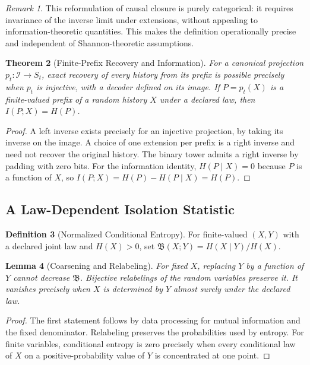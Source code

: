 \documentclass[11pt,a4paper]{article}
\theoremstyle{plain}
\newtheorem{theorem}{Theorem}[section]
\newtheorem{lemma}[theorem]{Lemma}
\theoremstyle{definition}
\newtheorem{definition}[theorem]{Definition}
\theoremstyle{remark}
\newtheorem{remark}[theorem]{Remark}
\begin{document}
\begin{remark}
This reformulation of causal closure is purely categorical: it requires invariance of the inverse limit under extensions, without appealing to information-theoretic quantities. This makes the definition operationally precise and independent of Shannon-theoretic assumptions.
\end{remark}

\begin{theorem}[Finite-Prefix Recovery and Information]\label{thm:info-isolation}
For a canonical projection $p_t:\mathcal I\to S_t$, exact recovery of every history from its prefix is possible precisely when $p_t$ is injective, with a decoder defined on its image. If $P=p_t(X)$ is a finite-valued prefix of a random history $X$ under a declared law, then $I(P;X)=H(P)$.
\end{theorem}
\begin{proof}
A left inverse exists precisely for an injective projection, by taking its inverse on the image. A choice of one extension per prefix is a right inverse and need not recover the original history. The binary tower admits a right inverse by padding with zero bits. For the information identity, $H(P\mid X)=0$ because $P$ is a function of $X$, so $I(P;X)=H(P)-H(P\mid X)=H(P)$.
\end{proof}

\subsection{A Law-Dependent Isolation Statistic}

\begin{definition}[Normalized Conditional Entropy]\label{def:isolation-functor}
For finite-valued $(X,Y)$ with a declared joint law and $H(X)>0$, set $\mathfrak B(X;Y)=H(X\mid Y)/H(X)$.
\end{definition}

\begin{lemma}[Coarsening and Relabeling]\label{lem:isolation-properties}
For fixed $X$, replacing $Y$ by a function of $Y$ cannot decrease $\mathfrak B$. Bijective relabelings of the random variables preserve it. It vanishes precisely when $X$ is determined by $Y$ almost surely under the declared law.
\end{lemma}
\begin{proof}
The first statement follows by data processing for mutual information and the fixed denominator. Relabeling preserves the probabilities used by entropy. For finite variables, conditional entropy is zero precisely when every conditional law of $X$ on a positive-probability value of $Y$ is concentrated at one point.
\end{proof}
\end{document}
